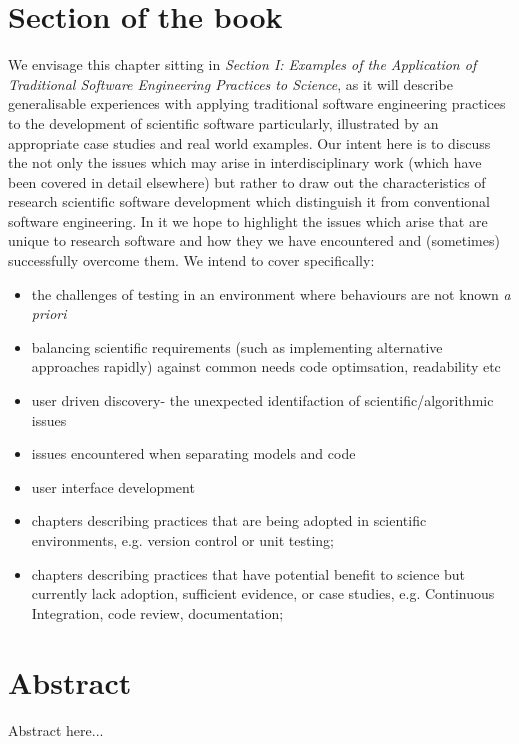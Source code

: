 \documentclass[a4paper,11pt]{article}
\begin{document}
\section*{Section of the book}

We envisage this chapter sitting in {\emph{Section I: Examples of the
Application of Traditional Software Engineering Practices to
Science}}, as it will describe generalisable experiences with applying
traditional software engineering practices to the development of
scientific software particularly, illustrated by an appropriate case
studies and real world examples. Our intent here is to discuss the 
not only the issues which may arise in interdisciplinary work (which
have been covered in detail elsewhere) but rather to draw out the
characteristics of research scientific software development which 
distinguish it from conventional software engineering. In it we hope
to highlight the issues which arise that are unique to research software
and how they we have encountered and (sometimes) successfully overcome 
them. We intend to cover specifically:

\begin{itemize}
\item the challenges of testing in an environment where behaviours 
	are not known \emph{a priori}
\item balancing scientific requirements (such as implementing alternative 
	approaches rapidly) against common needs code optimsation, 
	readability etc
\item user driven discovery- the unexpected identifaction of 
	scientific/algorithmic issues
\item issues encountered when separating models and code
\item user interface development
\item chapters describing practices that are being adopted in
  scientific environments, e.g. version control or unit testing;
\item chapters describing practices that have potential benefit to
  science but currently lack adoption, sufficient evidence, or case
  studies, e.g. Continuous Integration, code review, documentation;
\end{itemize}

\section*{Abstract}

Abstract here...
\end{document}
